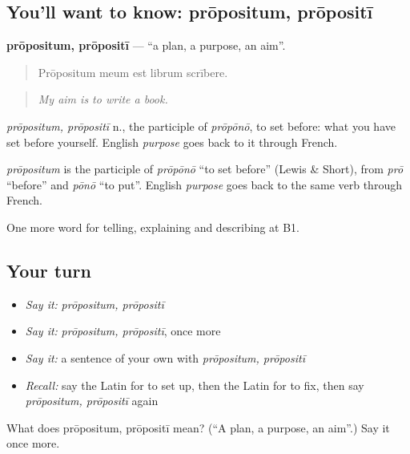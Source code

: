 \subsection*{You'll want to know: prōpositum, prōpositī}
\textbf{prōpositum, prōpositī} — \textquotedblleft{}a plan, a purpose, an aim\textquotedblright{}.

\begin{quote}
Prōpositum meum est librum scrībere.
\end{quote}

\begin{quote}
\emph{My aim is to write a book.}
\end{quote}

\emph{prōpositum, prōpositī} n., the participle of \emph{prōpōnō}, to set before: what you have set before yourself. English \emph{purpose} goes back to it through French.

\begin{cousinweb}
\emph{prōpositum} is the participle of \emph{prōpōnō} \textquotedblleft{}to set before\textquotedblright{} (Lewis \& Short), from \emph{prō} \textquotedblleft{}before\textquotedblright{} and \emph{pōnō} \textquotedblleft{}to put\textquotedblright{}. English \emph{purpose} goes back to the same verb through French.
\end{cousinweb}

\begin{grammarlens}[title={What you've built}]
One more word for telling, explaining and describing at B1.
\end{grammarlens}

\subsection*{Your turn}
\begin{itemize}
\raggedright
  \item \emph{Say it:} \emph{prōpositum, prōpositī}
  \item \emph{Say it:} \emph{prōpositum, prōpositī}, once more
  \item \emph{Say it:} a sentence of your own with \emph{prōpositum, prōpositī}
  \item \emph{Recall:} say the Latin for to set up, then the Latin for to fix, then say \emph{prōpositum, prōpositī} again
\end{itemize}

\begin{tcolorbox}[breakable,colback=teal!4,colframe=teal!35!black,title={Before you move on}]
What does prōpositum, prōpositī mean? (\textquotedblleft{}A plan, a purpose, an aim\textquotedblright{}.) Say it once more.
\end{tcolorbox}
